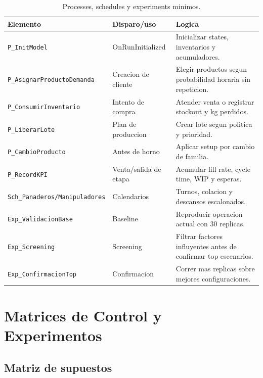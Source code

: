 \documentclass[12pt]{article}
\newcommand{\archivo}[1]{\texttt{#1}}
\begin{document}
\begin{table}[H]
\centering
\caption{Processes, schedules y experiments minimos.}
\begin{tabularx}{\textwidth}{L{4.0cm}L{4.1cm}Y}
\toprule
{}
\color{white}Elemento & \color{white}Disparo/uso & \color{white}Logica \\
\midrule
\archivo{P\_InitModel} & OnRunInitialized & Inicializar states, inventarios y acumuladores. \\
\archivo{P\_AsignarProductoDemanda} & Creacion de cliente & Elegir productos segun probabilidad horaria sin repeticion. \\
\archivo{P\_ConsumirInventario} & Intento de compra & Atender venta o registrar stockout y kg perdidos. \\
\archivo{P\_LiberarLote} & Plan de produccion & Crear lote segun politica y prioridad. \\
\archivo{P\_CambioProducto} & Antes de horno & Aplicar setup por cambio de familia. \\
\archivo{P\_RecordKPI} & Venta/salida de etapa & Acumular fill rate, cycle time, WIP y esperas. \\
\archivo{Sch\_Panaderos/Manipuladores} & Calendarios & Turnos, colacion y descansos escalonados. \\
\archivo{Exp\_ValidacionBase} & Baseline & Reproducir operacion actual con 30 replicas. \\
\archivo{Exp\_Screening} & Screening & Filtrar factores influyentes antes de confirmar top escenarios. \\
\archivo{Exp\_ConfirmacionTop} & Confirmacion & Correr mas replicas sobre mejores configuraciones. \\
\bottomrule
\end{tabularx}
\end{table}

\section{Matrices de Control y Experimentos}

\subsection{Matriz de supuestos}
\end{document}
